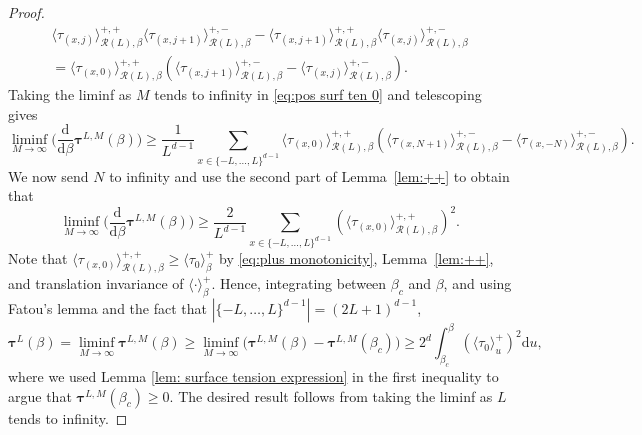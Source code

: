 \documentclass[11pt,a4paper]{article}
\numberwithin{equation}{section}
\theoremstyle{plain}
\theoremstyle{definition}
\begin{document}
\begin{proof}
\begin{multline}
\langle \tau_{(x,j)} \rangle^{+,+}_{\mathcal R(L),\beta}\langle \tau_{(x,j+1)} \rangle^{+,-}_{\mathcal R(L),\beta} - \langle \tau_{(x,j+1)} \rangle^{+,+}_{\mathcal R(L),\beta}\langle \tau_{(x,j)} \rangle^{+,-}_{\mathcal R(L),\beta} 
\\
= \langle \tau_{(x,0)} \rangle^{+,+}_{\mathcal R(L),\beta} \left( \langle \tau_{(x,j+1)} \rangle^{+,-}_{\mathcal R(L),\beta} - \langle \tau_{(x,j)} \rangle^{+,-}_{\mathcal R(L),\beta} \right).
\end{multline}
Taking the liminf as $M$ tends to infinity in \eqref{eq:pos surf ten 0} and telescoping gives
\begin{equation}
\liminf_{M\rightarrow \infty}\Big(\frac{\mathrm{d}}{\mathrm{d}\beta}\boldsymbol{\tau}^{L,M}(\beta) \Big)\geq\frac{1}{L^{d-1}}\sum_{x\in \{-L,\ldots,L\}^{d-1}} \langle \tau_{(x,0)} \rangle^{+,+}_{\mathcal R(L),\beta}\left(\langle \tau_{(x,N+1)} \rangle^{+,-}_{\mathcal R(L),\beta} - \langle \tau_{(x,-N)} \rangle^{+,-}_{\mathcal R(L),\beta} \right).
\end{equation}
We now send $N$ to infinity and use the second part of Lemma~\ref{lem:++} to obtain that 
\begin{equation}
\liminf_{M\rightarrow \infty}\Big(\frac{\mathrm{d}}{\mathrm{d}\beta}\boldsymbol{\tau}^{L,M}(\beta) \Big)\geq  \frac 2{L^{d-1}} \sum_{x\in \{-L,\ldots,L\}^{d-1}} \left(\langle \tau_{(x,0)} \rangle^{+,+}_{\mathcal R(L),\beta}\right)^2.
\end{equation}
Note that $\langle \tau_{(x,0)} \rangle^{+,+}_{\mathcal R(L),\beta}\geq \langle \tau_0 \rangle^+_{\beta}$ by \eqref{eq:plus monotonicity}, Lemma~\ref{lem:++}, and translation invariance of $\langle \cdot \rangle^+_{\beta}$. Hence, integrating between $\beta_c$ and $\beta$, and using Fatou's lemma and the fact that $|\{-L,\ldots, L\}^{d-1}|=(2L+1)^{d-1}$,
\begin{equation}
\boldsymbol{\tau}^L(\beta)=\liminf_{M\rightarrow\infty}\boldsymbol{\tau}^{L,M}(\beta)\geq 
\liminf_{M\rightarrow\infty}\Big(\boldsymbol{\tau}^{L,M}(\beta)-\boldsymbol{\tau}^{L,M}(\beta_c)\Big)\geq 2^d\int_{\beta_c}^{\beta} \left( \langle \tau_0 \rangle^{+}_{u}\right)^2 \mathrm{d}u,
\end{equation}
where we used Lemma \ref{lem: surface tension expression} in the first inequality to argue that $\boldsymbol{\tau}^{L,M}(\beta_c)\geq 0$.
The desired result follows from taking the liminf as $L$ tends to infinity.
\end{proof}
\end{document}
